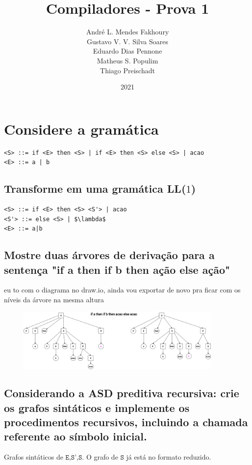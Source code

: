\documentclass{article}
\title{Compiladores - Prova 1}
\author{André L. Mendes Fakhoury\\
Gustavo V. V. Silva Soares\\
Eduardo Dias Pennone\\
Matheus S. Populim\\
Thiago Preischadt\\
}
\date{2021}
\begin{document}
\maketitle

\section{Considere a gramática}
\begin{lstlisting}
<S> ::= if <E> then <S> | if <E> then <S> else <S> | acao
<E> ::= a | b
\end{lstlisting}

\subsection{Transforme em uma gramática LL($1$)}

\begin{lstlisting}
<S> ::= if <E> then <S> <S'> | acao
<S'> ::= else <S> | $\lambda$
<E> ::= a|b
\end{lstlisting}




\subsection{Mostre duas árvores de derivação para a sentença "if a then if b then ação else ação"}
eu to com o diagrama no draw.io, ainda vou exportar de novo pra ficar com os níveis da árvore na mesma altura
\begin{figure}[ht!]
    \centering
    \includegraphics[width=0.9\textwidth]{p1/arvores sintaticas.png}
\end{figure}

\newpage

\subsection{Considerando a ASD preditiva recursiva: crie os grafos sintáticos e implemente os
procedimentos recursivos, incluindo a chamada referente ao símbolo inicial.}

Grafos sintáticos de $\texttt{E,S',S}$. O grafo de $\texttt{S}$ já está no formato reduzido.
\end{document}
